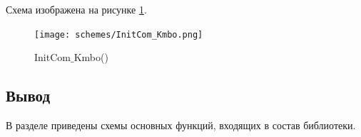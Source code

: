 	Схема изображена на рисунке \ref{fig15:image}.
	
	\begin{figure}[ph!]
		\centering
		\begin{center}
			{\texttt{[image: schemes/InitCom\_Kmbо.png]}}
			\caption{InitCom$\_$Kmbo()}
			\label{fig15:image}
		\end{center}
	\end{figure}

	\subsection{Вывод}
	В разделе приведены схемы основных функций, входящих в состав библиотеки.

